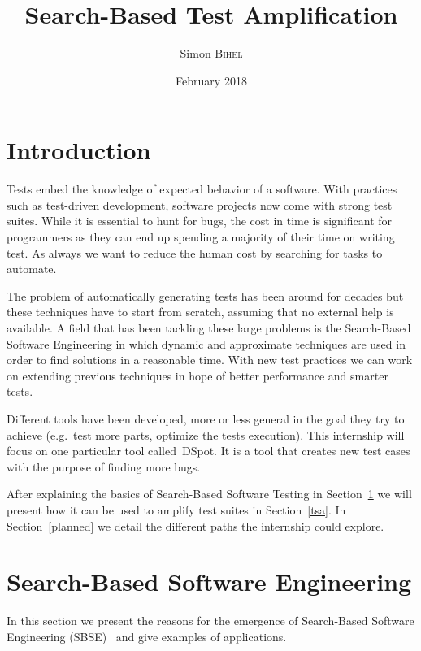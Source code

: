 \documentclass[11pt]{sdm}
\title{Search-Based Test Amplification}
\author{Simon \textsc{Bihel}}
\date{February 2018}
\newcommand{\dspot}{DSpot\xspace}
\begin{document}
\maketitle

\section*{Introduction}
\label{intro}
Tests embed the knowledge of expected behavior of a software.
With practices such as test-driven development, software projects now come with strong test suites.
While it is essential to hunt for bugs, the cost in time is significant for programmers as they can end up spending a majority of their time on writing test.
As always we want to reduce the human cost by searching for tasks to automate.

The problem of automatically generating tests has been around for decades but these techniques have to start from scratch, assuming that no external help is available.
A field that has been tackling these large problems is the Search-Based Software Engineering in which dynamic and approximate techniques are used in order to find solutions in a reasonable time.
With new test practices we can work on extending previous techniques in hope of better performance and smarter tests.

Different tools have been developed, more or less general in the goal they try to achieve (e.g.\ test more parts, optimize the tests execution).
This internship will focus on one particular tool called~\dspot{}.
It is a tool that creates new test cases with the purpose of finding more bugs.

After explaining the basics of Search-Based Software Testing in Section~\ref{sbse} we will present how it can be used to amplify test suites in Section~\ref{tsa}.
In Section~\ref{planned} we detail the different paths the internship could explore.


\section{Search-Based Software Engineering}
\label{sbse}

In this section we present the reasons for the emergence of Search-Based Software Engineering (SBSE)~\cite{harman2001search,mcminn2011search} and give examples of applications.
\end{document}
